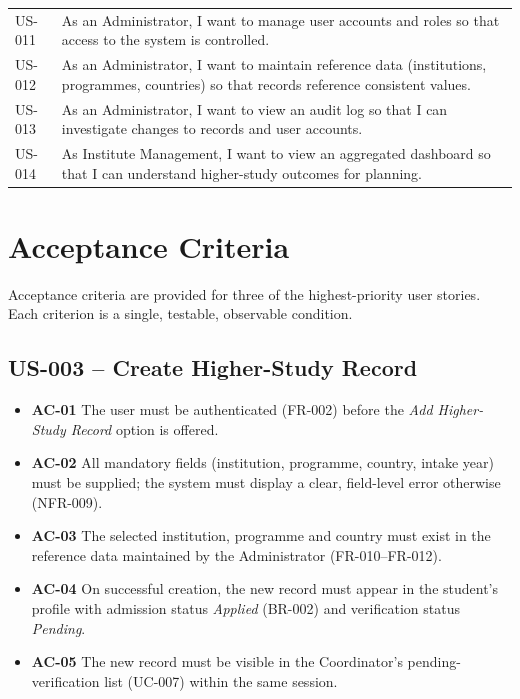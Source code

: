 \documentclass[11pt,a4paper]{article}
\begin{document}
\begin{longtable}{@{}p{1.4cm} p{14.5cm}@{}}
US-011 & As an Administrator, I want to manage user accounts and roles so that access to the system is controlled. \\
US-012 & As an Administrator, I want to maintain reference data (institutions, programmes, countries) so that records reference consistent values. \\
US-013 & As an Administrator, I want to view an audit log so that I can investigate changes to records and user accounts. \\
US-014 & As Institute Management, I want to view an aggregated dashboard so that I can understand higher-study outcomes for planning. \\
\bottomrule
\end{longtable}

\section{Acceptance Criteria}
Acceptance criteria are provided for three of the highest-priority user
stories. Each criterion is a single, testable, observable condition.

\subsection*{US-003 -- Create Higher-Study Record}
\begin{itemize}
  \item \textbf{AC-01} The user must be authenticated (FR-002) before the \emph{Add Higher-Study Record} option is offered.
  \item \textbf{AC-02} All mandatory fields (institution, programme, country, intake year) must be supplied; the system must display a clear, field-level error otherwise (NFR-009).
  \item \textbf{AC-03} The selected institution, programme and country must exist in the reference data maintained by the Administrator (FR-010--FR-012).
  \item \textbf{AC-04} On successful creation, the new record must appear in the student's profile with admission status \emph{Applied} (BR-002) and verification status \emph{Pending}.
  \item \textbf{AC-05} The new record must be visible in the Coordinator's pending-verification list (UC-007) within the same session.
\end{itemize}
\end{document}
